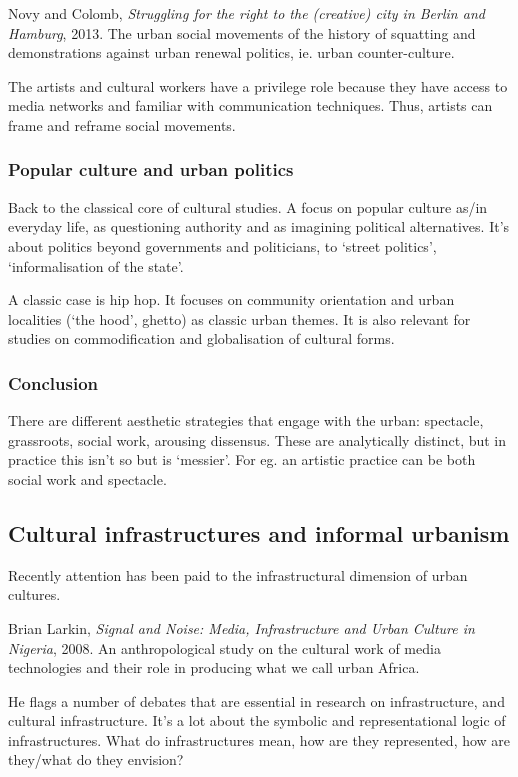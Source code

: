\documentclass{article}
\begin{document}
Novy and Colomb, \textit{Struggling for the right to the (creative) city in Berlin and Hamburg}, 2013.
The urban social movements of the history of squatting and demonstrations against urban renewal politics, ie. urban counter-culture.

The artists and cultural workers have a privilege role because they have access to media networks and familiar with communication techniques. Thus, artists can frame and reframe social movements. 

\subsubsection{Popular culture and urban politics}

Back to the classical core of cultural studies. A focus on popular culture as/in everyday life, as questioning authority and as imagining political alternatives. It's about politics beyond governments and politicians, to `street politics', `informalisation of the state'.

A classic case is hip hop. It focuses on community orientation and urban localities (`the hood', ghetto) as classic urban themes. It is also relevant for studies on commodification and globalisation of cultural forms.

\subsubsection{Conclusion}

There are different aesthetic strategies that engage with the urban: spectacle, grassroots, social work, arousing dissensus. These are analytically distinct, but in practice this isn't so but is `messier'. For eg. an artistic practice can be both social work and spectacle.

\subsection{Cultural infrastructures and informal urbanism}

Recently attention has been paid to the infrastructural dimension of urban cultures.

Brian Larkin, \textit{Signal and Noise: Media, Infrastructure and Urban Culture in Nigeria}, 2008. An anthropological study on the cultural work of media technologies and their role in producing what we call urban Africa.

He flags a number of debates that are essential in research on infrastructure, and cultural infrastructure. It's a lot about the symbolic and representational logic of infrastructures. What do infrastructures mean, how are they represented, how are they/what do they envision?
\end{document}
